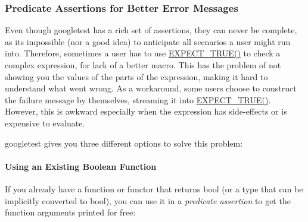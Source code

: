 \subsubsection*{Predicate Assertions for Better Error Messages}

Even though googletest has a rich set of assertions, they can never be complete, as it\textquotesingle{}s impossible (nor a good idea) to anticipate all scenarios a user might run into. Therefore, sometimes a user has to use {\ttfamily \mbox{\hyperlink{gtest_8h_ac33e7cdfb5d44a7a0f0ab552eb5c3c6a}{E\+X\+P\+E\+C\+T\+\_\+\+T\+R\+U\+E()}}} to check a complex expression, for lack of a better macro. This has the problem of not showing you the values of the parts of the expression, making it hard to understand what went wrong. As a workaround, some users choose to construct the failure message by themselves, streaming it into {\ttfamily \mbox{\hyperlink{gtest_8h_ac33e7cdfb5d44a7a0f0ab552eb5c3c6a}{E\+X\+P\+E\+C\+T\+\_\+\+T\+R\+U\+E()}}}. However, this is awkward especially when the expression has side-\/effects or is expensive to evaluate.

googletest gives you three different options to solve this problem\+:

\paragraph*{Using an Existing Boolean Function}

If you already have a function or functor that returns {\ttfamily bool} (or a type that can be implicitly converted to {\ttfamily bool}), you can use it in a {\itshape predicate assertion} to get the function arguments printed for free\+:

